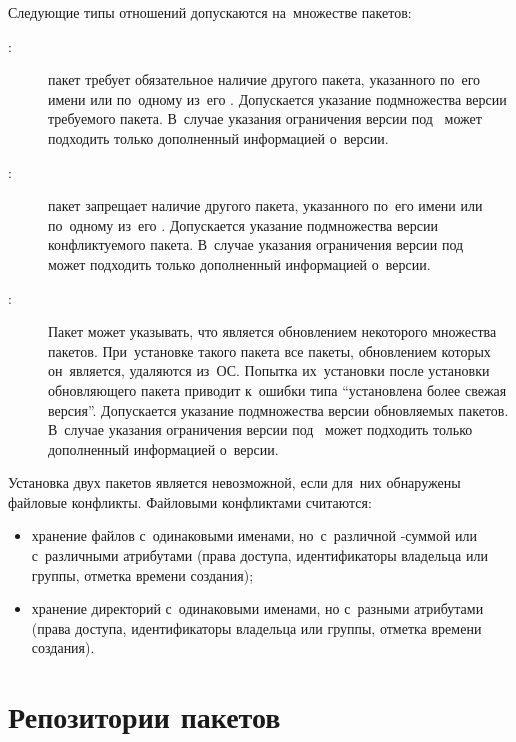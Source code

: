 Следующие типы отношений допускаются на~множестве пакетов:

\begin{description}

\item[:]
пакет требует обязательное наличие другого пакета, указанного по~его имени или по~одному из~его .
Допускается указание подмножества версии требуемого пакета.
В~случае указания ограничения версии под~ может подходить  только дополненный информацией о~версии.

\item[:]
пакет запрещает наличие другого пакета, указанного по~его имени или по~одному из~его .
Допускается указание подмножества версии конфликтуемого пакета.
В~случае указания ограничения версии под~ может подходить  только дополненный информацией о~версии.

\item[:]
Пакет может указывать, что является обновлением некоторого множества пакетов.
При~установке такого пакета все пакеты, обновлением которых он~является, удаляются из~ОС.
Попытка их~установки после установки обновляющего пакета приводит к~ошибки типа ``установлена более свежая версия''.
Допускается указание подмножества версии обновляемых пакетов.
В~случае указания ограничения версии под~ может подходить  только дополненный информацией о~версии.

\end{description}

Установка двух пакетов является невозможной, если для~них обнаружены файловые конфликты.
Файловыми конфликтами считаются:

\begin{itemize}

\item {
хранение файлов с~одинаковыми именами, но~с~различной -суммой или с~различными атрибутами 
(права доступа, идентификаторы владельца или группы, отметка времени создания);
}

\item {
хранение директорий с~одинаковыми именами, но с~разными атрибутами 
(права доступа, идентификаторы владельца или группы, отметка времени создания).
}

\end{itemize}

\section{Репозитории пакетов}


